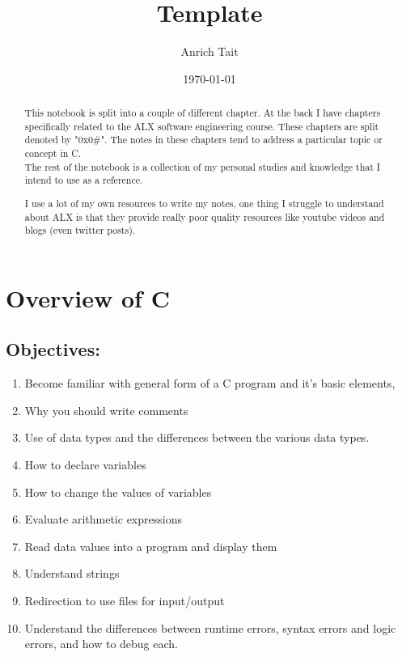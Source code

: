 \documentclass[12pt, letterpaper]{report}
\title{Template}
\author{Anrich Tait}
\date{\today}
\begin{document}
\restoregeometry %
\nopagecolor%

\begin{abstract}
	This notebook is split into a couple of different chapter. At the back I 
	have chapters specifically related to the ALX software engineering course. 
	These chapters are split denoted by "0x0\#". The notes in these chapters 
	tend to address a particular topic or concept in C. \\
	The rest of the notebook is a collection of my personal studies and 
	knowledge that I intend to use as a reference.

	I use a lot of my own resources to write my notes, one thing I struggle to 
	understand about ALX is that they provide really poor quality resources like 
	youtube videos and blogs (even twitter posts).
\end{abstract}
\tableofcontents

\chapter{Overview of C}
\section{Objectives:}
\begin{enumerate}
	\item Become familiar with general form of a C program and it's basic elements,
	\item Why you should write comments
	\item Use of data types and the differences between the various data types.
	\item How to declare variables
	\item How to change the values of variables
	\item Evaluate arithmetic expressions
	\item Read data values into a program and display them
	\item Understand strings
	\item Redirection to use files for input/output
	\item Understand the differences between runtime errors, syntax errors and logic errors, and how to debug each.
\end{enumerate}
\end{document}
